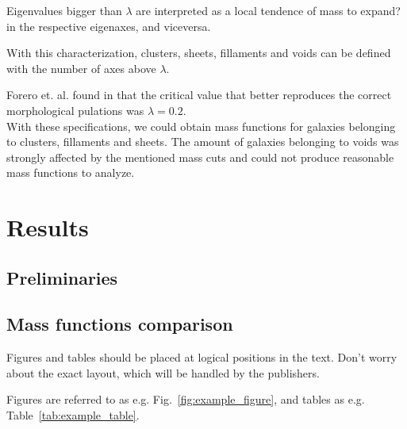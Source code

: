 \documentclass[a4paper,fleqn,usenatbib]{mnras}
\begin{document}
Eigenvalues bigger than $\lambda$ are interpreted as a local tendence of mass to expand? in the respective eigenaxes, and viceversa. 

With this characterization, clusters, sheets, fillaments and voids can be defined with the number of axes above $\lambda$.

Forero et. al. found in \cite{forero1} that the critical value that better reproduces the correct morphological pulations was $\lambda = 0.2$. \\

With these specifications, we could obtain mass functions for galaxies belonging to clusters, fillaments and sheets. The amount of galaxies belonging to voids was strongly affected by the mentioned mass cuts and could not produce reasonable mass functions to analyze.


\section{Results}
\subsection{Preliminaries}

\subsection{Mass functions comparison}

Figures and tables should be placed at logical positions in the text. Don't
worry about the exact layout, which will be handled by the publishers.

Figures are referred to as e.g. Fig.~\ref{fig:example_figure}, and tables as
e.g. Table~\ref{tab:example_table}.
\end{document}
